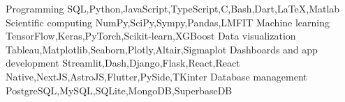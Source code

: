 
\begin{cvskills}

\cvskill
{Programming}
{SQL,Python,JavaScript,TypeScript,C,Bash,Dart,LaTeX,Matlab}
\cvskill
{Scientific computing}
{NumPy,SciPy,Sympy,Pandas,LMFIT}
\cvskill
{Machine learning}
{TensorFlow,Keras,PyTorch,Scikit‑learn,XGBoost}
\cvskill
{Data visualization}
{Tableau,Matplotlib,Seaborn,Plotly,Altair,Sigmaplot}
\cvskill
{Dashboards and app development}
{Streamlit,Dash,Django,Flask,React,React Native,NextJS,AstroJS,Flutter,PySide,TKinter}
\cvskill
{Database management}
{PostgreSQL,MySQL,SQLite,MongoDB,SuperbaseDB}
\end{cvskills}